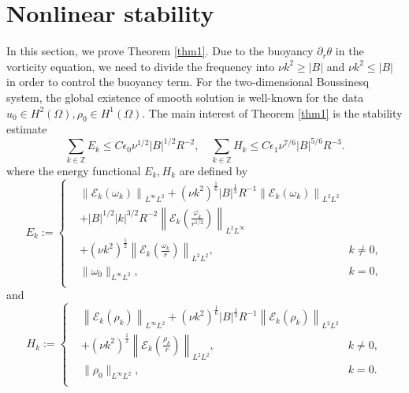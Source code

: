 \documentclass[final, 12pt,reqno]{amsart}
\numberwithin{equation}{section}
\begin{document}
\section{Nonlinear stability}
In this section, we prove Theorem \ref{thm1}. Due to the buoyancy $\partial_r \theta$ in the vorticity equation, we need to divide the frequency into $\nu k^2\geq |B|$ and $\nu k^2\leq |B|$  in order to control the buoyancy term. For the two-dimensional Boussinesq system, the global existence of smooth solution is well-known for the data $u_{0}\in H^2(\Omega),\rho_{0}\in H^1(\Omega).$ The main interest of Theorem \ref{thm1} is the stability estimate
\begin{equation}\label{6.1}
    \sum_{k\in\mathbb{Z}}E_k\leq C\epsilon_0\nu^{1/2}|B|^{1/2}R^{-2},\quad
    \sum_{k\in\mathbb{Z}}H_k\leq C\epsilon_1\nu^{7/6}|B|^{5/6}R^{-3}.
\end{equation}
where the energy functional $E_k,H_k$ are defined by
    \begin{equation}
        E_k:=   \left\{
        \begin{aligned}
  & \left\|\mathcal{E}_k (\omega_k)\right\|_{L^{\infty} L^2}+\left(\nu k^2\right)^{\frac{1}{6}}|B|^{\frac{1}{3}} R^{-1}\left\|\mathcal{E}_k (\omega_k)\right\|_{L^2 L^2}\\
      &+|B|^{1/2}|k|^{3/2}R^{-2}\left\|\mathcal{E}_k (\frac{\varphi_k}{r^{1/2}})\right\|_{L^2 L^\infty}\\
      &+\left(\nu k^2\right)^{\frac{1}{2}}\left\|\mathcal{E}_k (\frac{\omega_k}{r})\right\|_{L^2 L^2}
 ,&k\neq 0,\\
            &\|\omega_0\|_{L^\infty L^2},&k=0,\\
        \end{aligned}
        \right.
    \end{equation}
    and
    \begin{equation}
        H_k:=   \left\{
        \begin{aligned}
  &\left\|\mathcal{E}_k (\rho_k)\right\|_{L^{\infty} L^2}+\left(\nu k^2\right)^{\frac{1}{6}}|B|^{\frac{1}{3}} R^{-1}\left\|\mathcal{E}_k (\rho_k)\right\|_{L^2 L^2}\\
 &+\left(\nu k^2\right)^{\frac{1}{2}}\left\|\mathcal{E}_k (\frac{\rho_k}{r})\right\|_{L^2 L^2},
            &k\neq 0,\\
            &\|\rho_0\|_{L^\infty L^2},&k=0.\\
        \end{aligned}
        \right.
    \end{equation}
\end{document}
